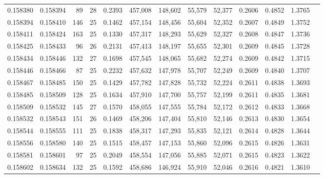 \begin{tabular}{rrrrrrrrrrrrr}
0.158380 & 0.158394 &  89 &  28 &                                     0.2393 & 457,008 & 148,602 &  55,579 &  52,377 & 0.2606 & 0.4852 & 1.3765 \\
0.158394 & 0.158410 & 146 &  25 &                                     0.1462 & 457,154 & 148,456 &  55,604 &  52,352 & 0.2607 & 0.4849 & 1.3752 \\
0.158411 & 0.158424 & 163 &  25 &                                     0.1330 & 457,317 & 148,293 &  55,629 &  52,327 & 0.2608 & 0.4847 & 1.3736 \\
0.158425 & 0.158433 &  96 &  26 &                                     0.2131 & 457,413 & 148,197 &  55,655 &  52,301 & 0.2609 & 0.4845 & 1.3728 \\
0.158434 & 0.158446 & 132 &  27 &                                     0.1698 & 457,545 & 148,065 &  55,682 &  52,274 & 0.2609 & 0.4842 & 1.3715 \\
0.158446 & 0.158466 &  87 &  25 &                                     0.2232 & 457,632 & 147,978 &  55,707 &  52,249 & 0.2609 & 0.4840 & 1.3707 \\
0.158467 & 0.158485 & 150 &  25 &                                     0.1429 & 457,782 & 147,828 &  55,732 &  52,224 & 0.2611 & 0.4838 & 1.3693 \\
0.158485 & 0.158509 & 128 &  25 &                                     0.1634 & 457,910 & 147,700 &  55,757 &  52,199 & 0.2611 & 0.4835 & 1.3681 \\
0.158509 & 0.158532 & 145 &  27 &                                     0.1570 & 458,055 & 147,555 &  55,784 &  52,172 & 0.2612 & 0.4833 & 1.3668 \\
0.158532 & 0.158543 & 151 &  26 &                                     0.1469 & 458,206 & 147,404 &  55,810 &  52,146 & 0.2613 & 0.4830 & 1.3654 \\
0.158544 & 0.158555 & 111 &  25 &                                     0.1838 & 458,317 & 147,293 &  55,835 &  52,121 & 0.2614 & 0.4828 & 1.3644 \\
0.158556 & 0.158580 & 140 &  25 &                                     0.1515 & 458,457 & 147,153 &  55,860 &  52,096 & 0.2615 & 0.4826 & 1.3631 \\
0.158581 & 0.158601 &  97 &  25 &                                     0.2049 & 458,554 & 147,056 &  55,885 &  52,071 & 0.2615 & 0.4823 & 1.3622 \\
0.158602 & 0.158634 & 132 &  25 &                                     0.1592 & 458,686 & 146,924 &  55,910 &  52,046 & 0.2616 & 0.4821 & 1.3610 \\

\end{tabular}
